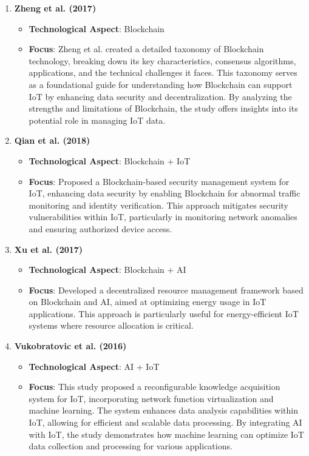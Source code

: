 \documentclass[12pt, oneside]{report}
\begin{document}
\begin{enumerate}
\item \textbf{Zheng et al. (2017)\cite{zheng2018}}
\begin{itemize}
    \item \textbf{Technological Aspect}: Blockchain
    \item \textbf{Focus}: Zheng et al. created a detailed taxonomy of Blockchain technology, breaking down its key characteristics, consensus algorithms, applications, and the technical challenges it faces. This taxonomy serves as a foundational guide for understanding how Blockchain can support IoT by enhancing data security and decentralization. By analyzing the strengths and limitations of Blockchain, the study offers insights into its potential role in managing IoT data.
\end{itemize}


\item \textbf{Qian et al. (2018)\cite{qian2018}}
\begin{itemize}
    \item \textbf{Technological Aspect}: Blockchain + IoT
    \item \textbf{Focus}: Proposed a Blockchain-based security management system for IoT, enhancing data security by enabling Blockchain for abnormal traffic monitoring and identity verification. This approach mitigates security vulnerabilities within IoT, particularly in monitoring network anomalies and ensuring authorized device access.
\end{itemize}


\item \textbf{Xu et al. (2017)\cite{xu2017}}
\begin{itemize}
    \item \textbf{Technological Aspect}: Blockchain + AI
    \item \textbf{Focus}: Developed a decentralized resource management framework based on Blockchain and AI, aimed at optimizing energy usage in IoT applications. This approach is particularly useful for energy-efficient IoT systems where resource allocation is critical.
\end{itemize}


\item \textbf{Vukobratovic et al. (2016)\cite{vukobratovic2016}}
\begin{itemize}
    \item \textbf{Technological Aspect}: AI + IoT
    \item \textbf{Focus}: This study proposed a reconfigurable knowledge acquisition system for IoT, incorporating network function virtualization and machine learning. The system enhances data analysis capabilities within IoT, allowing for efficient and scalable data processing. By integrating AI with IoT, the study demonstrates how machine learning can optimize IoT data collection and processing for various applications.
\end{itemize}
\end{enumerate}
\end{document}
